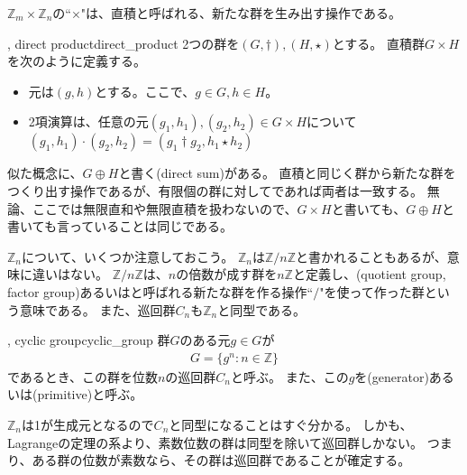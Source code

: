 $\mathbb{Z}_m \times \mathbb{Z}_n$の``$\times$"は、直積と呼ばれる、新たな群を生み出す操作である。

\begin{Defi}{, direct product}{direct_product}
2つの群を$(G, \dagger),(H, \star)$とする。
直積群$G \times H$を次のように定義する。
\begin{itemize}
 \item 元は$(g, h)$とする。ここで、$g \in G, h \in H$。
 \item 2項演算は、任意の元$(g_1, h_1), (g_2, h_2)\in G \times H$について$(g_1, h_1)\cdot(g_2, h_2) = (g_1 \dagger g_2, h_1 \star h_2)$
\end{itemize}
\end{Defi}

似た概念に、$G \oplus H$と書く(direct sum)がある。
直積と同じく群から新たな群をつくり出す操作であるが、有限個の群に対してであれば両者は一致する。
無論、ここでは無限直和や無限直積を扱わないので、$G \times H$と書いても、$G \oplus H$と書いても言っていることは同じである。

$\mathbb{Z}_n$について、いくつか注意しておこう。
$\mathbb{Z}_n$は$\mathbb{Z}/n\mathbb{Z}$と書かれることもあるが、意味に違いはない。
$\mathbb{Z}/n\mathbb{Z}$は、$n$の倍数が成す群を$n\mathbb{Z}$と定義し、(quotient group, factor group)あるいはと呼ばれる新たな群を作る操作``$/$"を使って作った群という意味である。
また、巡回群$C_n$も$\mathbb{Z}_n$と同型である。

\begin{Defi}{, cyclic group}{cyclic_group}
群$G$のある元$g\in G$が
\begin{align*}
G = \{g^n : n \in \mathbb{Z}\}
\end{align*}
であるとき、この群を位数$n$の巡回群$C_n$と呼ぶ。
また、この$g$を(generator)あるいは(primitive)と呼ぶ。
\end{Defi}

$\mathbb{Z}_n$は1が生成元となるので$C_n$と同型になることはすぐ分かる。
しかも、Lagrangeの定理の系より、素数位数の群は同型を除いて巡回群しかない。
つまり、ある群の位数が素数なら、その群は巡回群であることが確定する。

